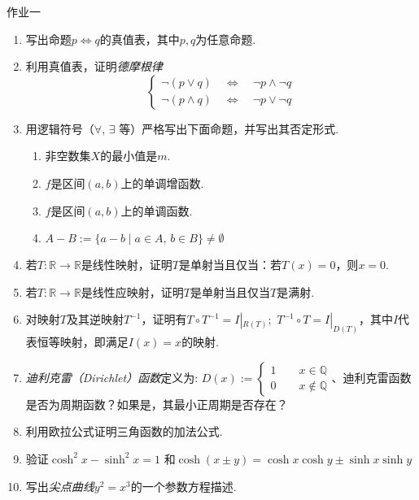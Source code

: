 \documentclass{article}
\begin{document}
\large

\begin{center}
{\Large 作业\quad 一 }
\end{center}

\vspace{3pt}

\begin{enumerate}
    \item 写出命题$p\Longleftrightarrow 
 q$的真值表，其中$p,q$为任意命题. 
 \item 利用真值表，证明\textit{德摩根律}\[\left\{\begin{array}{c}
          \neg (p\lor q)\quad \Longleftrightarrow \quad \neg p\land \neg q \\
          \neg(p\land q)\quad \Longleftrightarrow \quad \neg p\lor \neg q
    \end{array}\right.\]
    \item 用逻辑符号（$\forall,\,\exists$ 等）严格写出下面命题，并写出其否定形式.
    \begin{enumerate}
        \item 非空数集$X$的最小值是$m$.
        \item $f$是区间$(a,b)$上的单调增函数.
        \item $f$是区间$(a,b)$上的单调函数.
        \item $A-B:=\{a-b\mid a\in A,\,b\in B\}\neq \emptyset$
    \end{enumerate}
    \item 若$T:\mathbb{R}\to\mathbb{R}$是线性映射，证明$T$是单射当且仅当：若$T(x)=0$，则$x=0$. 
    \item 若$T:\mathbb{R}\to\mathbb{R}$是线性应映射，证明$T$是单射当且仅当$T$是满射. 
     \item 对映射$T$及其逆映射$T^{-1}$，证明有$T\circ T^{-1}=I|_{R(T)};\,\, T^{-1}\circ T=I|_{D(T)}$，其中$I$代表恒等映射，即满足$I(x)=x$的映射. 
     \item  \textit{迪利克雷（Dirichlet）函数}定义为: $D(x):=\left\{\begin{array}{c}
     1\qquad x\in \mathbb{Q}  \\
     0\qquad x\notin \mathbb{Q}
\end{array}\right.$、\quad  迪利克雷函数是否为周期函数？如果是，其最小正周期是否存在？
\item 利用欧拉公式证明三角函数的加法公式.
\item 验证$\cosh^{2}{x}-\sinh^{2}{x}=1$ 和$\cosh{(x\pm y)}=\cosh{x}\cosh{y}\pm \sinh{x}\sinh{y}$
\item 写出\textit{尖点曲线}$y^{2}=x^{3}$的一个参数方程描述.

\end{enumerate}
\end{document}
